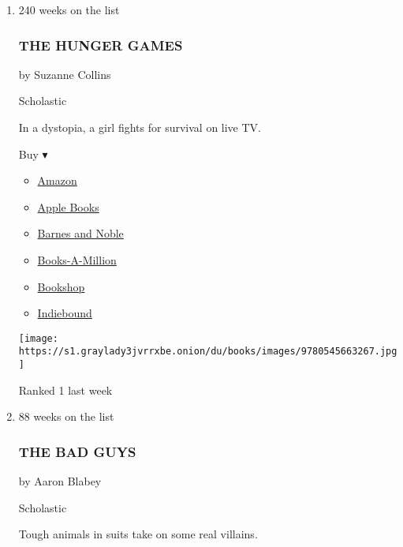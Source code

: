 \begin{enumerate}
\def\labelenumi{\arabic{enumi}.}
\item
  240 weeks on the list

  \hypertarget{the-hunger-games}{%
  \subsubsection{THE HUNGER GAMES}\label{the-hunger-games}}

  by Suzanne Collins

  Scholastic

  In a dystopia, a girl fights for survival on live TV.

  Buy ▾

  \begin{itemize}
  \tightlist
  \item
    \href{http://www.amazon.com/Mockingjay-Final-Book-Hunger-Games/dp/0545663261?tag=NYTBS-20}{Amazon}
  \item
    \href{https://du-gae-books-dot-nyt-du-prd.appspot.com/buy?title=THE+HUNGER+GAMES\&author=Suzanne+Collins}{Apple
    Books}
  \item
    \href{https://www.anrdoezrs.net/click-7990613-11819508?url=https\%3A\%2F\%2Fwww.barnesandnoble.com\%2Fw\%2F\%3Fean\%3D9781338635171}{Barnes
    and Noble}
  \item
    \href{https://www.anrdoezrs.net/click-7990613-35140?url=https\%3A\%2F\%2Fwww.booksamillion.com\%2Fp\%2FTHE\%2BHUNGER\%2BGAMES\%2FSuzanne\%2BCollins\%2F9781338635171}{Books-A-Million}
  \item
    \href{https://bookshop.org/a/3546/9781338635171}{Bookshop}
  \item
    \href{https://www.indiebound.org/book/9781338635171?aff=NYT}{Indiebound}
  \end{itemize}

  \texttt{[image: https://s1.graylady3jvrrxbe.onion/du/books/images/9780545663267.jpg]}

  Ranked 1 last week
\item
  88 weeks on the list

  \hypertarget{the-bad-guys}{%
  \subsubsection{THE BAD GUYS}\label{the-bad-guys}}

  by Aaron Blabey

  Scholastic

  Tough animals in suits take on some real villains.


\end{enumerate}
